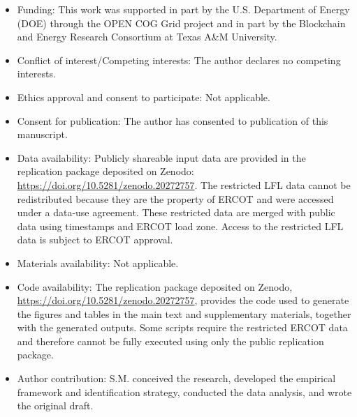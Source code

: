 \documentclass[pdflatex,sn-mathphys-num]{sn-jnl}%
\theoremstyle{thmstyleone}%
\theoremstyle{thmstyletwo}%
\theoremstyle{thmstylethree}%
\begin{document}
\begin{itemize}
\item Funding: This work was supported in part by the U.S. Department of Energy (DOE) through the OPEN COG Grid project and in part by the Blockchain and Energy Research Consortium at Texas A\&M University.
\item Conflict of interest/Competing interests: The author declares no competing interests.
\item Ethics approval and consent to participate: Not applicable.
\item Consent for publication: The author has consented to publication of this manuscript.
\item Data availability: Publicly shareable input data are provided in the replication package deposited on Zenodo: \url{https://doi.org/10.5281/zenodo.20272757}. The restricted LFL data cannot be redistributed because they are the property of ERCOT and were accessed under a data-use agreement. These restricted data are merged with public data using timestamps and ERCOT load zone. Access to the restricted LFL data is subject to ERCOT approval.
\item Materials availability: Not applicable.
\item Code availability: The replication package deposited on Zenodo, \url{https://doi.org/10.5281/zenodo.20272757}, provides the code used to generate the figures and tables in the main text and supplementary materials, together with the generated outputs. Some scripts require the restricted ERCOT data and therefore cannot be fully executed using only the public replication package.
\item Author contribution: S.M. conceived the research, developed the empirical framework and identification strategy, conducted the data analysis, and wrote the original draft.
\end{itemize}

\end{document}

